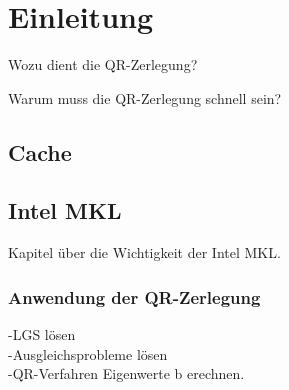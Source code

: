 \chapter{Einleitung}

Wozu dient die QR-Zerlegung?


Warum muss die QR-Zerlegung schnell sein?

\section{Cache}

\section{Intel MKL}

Kapitel über die Wichtigkeit der Intel MKL.

\subsection{Anwendung der QR-Zerlegung}
-LGS lösen\\
-Ausgleichsprobleme lösen \\
-QR-Verfahren Eigenwerte b  erechnen.